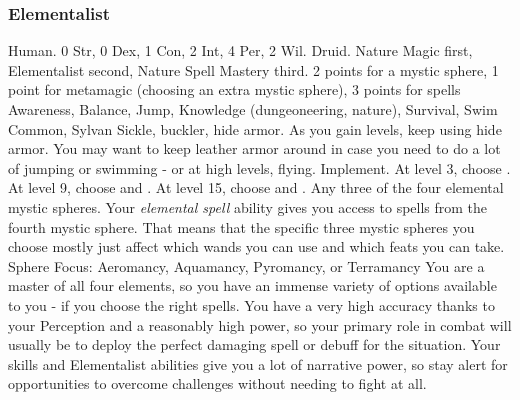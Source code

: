         \subsubsection{Elementalist}
             Human.
             0 Str, 0 Dex, 1 Con, 2 Int, 4 Per, 2 Wil.
             Druid.
             Nature Magic first, Elementalist second, Nature Spell Mastery third.
             2 points for a mystic sphere, 1 point for metamagic (choosing an extra mystic sphere), 3 points for spells
             Awareness, Balance, Jump, Knowledge (dungeoneering, nature), Survival, Swim
             Common, Sylvan
             Sickle, buckler, hide armor. As you gain levels, keep using hide armor.
            You may want to keep leather armor around in case you need to do a lot of jumping or swimming - or at high levels, flying.
             Implement.
                At level 3, choose .
                At level 9, choose  and .
                At level 15, choose  and .
             Any three of the four elemental mystic spheres.
            Your \textit{elemental spell} ability gives you access to spells from the fourth mystic sphere.
            That means that the specific three mystic spheres you choose mostly just affect which wands you can use and which feats you can take.
             Sphere Focus: Aeromancy, Aquamancy, Pyromancy, or Terramancy
             You are a master of all four elements, so you have an immense variety of options available to you - if you choose the right spells.
            You have a very high accuracy thanks to your Perception and a reasonably high power, so your primary role in combat will usually be to deploy the perfect damaging spell or debuff for the situation.
            Your skills and Elementalist abilities give you a lot of narrative power, so stay alert for opportunities to overcome challenges without needing to fight at all.

